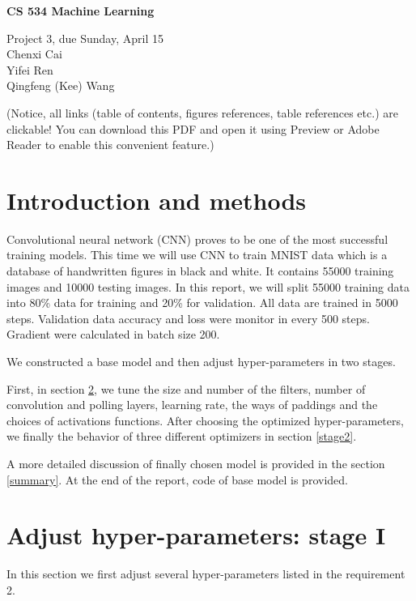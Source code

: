 \documentclass[11pt]{article}
\begin{document}
\begin{center}
  {\bf
  CS 534 Machine Learning  }

\vspace{12pt}

  Project 3, due Sunday, April 15
  \\
  Chenxi Cai \\
  Yifei Ren \\
  Qingfeng (Kee) Wang
 
\end{center}

\vspace{12pt}




\clearpage
(Notice, all links (table of contents, figures references, table references etc.) are clickable! You can download this PDF and open it using Preview or Adobe Reader to enable this convenient feature.)
 
\tableofcontents{}

\clearpage


\section{Introduction and methods}
Convolutional neural network (CNN) proves to be one of the most successful training models. This time we will use CNN to train MNIST data which is a database of handwritten figures in black and white. It contains 55000 training images and 10000 testing images. In this report, we will split 55000 training data into 80\% data for training and 20\% for validation. All data are trained in 5000 steps. Validation data accuracy and loss were monitor in every 500 steps. Gradient were calculated in batch size 200.


We constructed a base model and then adjust  hyper-parameters in two stages. 

First, in section \ref{stage1}, we tune the size and number of the filters, number of convolution and polling layers, learning rate, the ways of paddings and the choices of activations functions. After choosing the optimized hyper-parameters, we finally the behavior of three different optimizers in section \ref{stage2}. 

A more detailed discussion of finally chosen model is provided in the section \ref{summary}. At the end of the report, code of base model is provided.



\section{Adjust hyper-parameters: stage I}
\label{stage1}
In this section we first adjust several hyper-parameters listed in the requirement 2.
\end{document}
